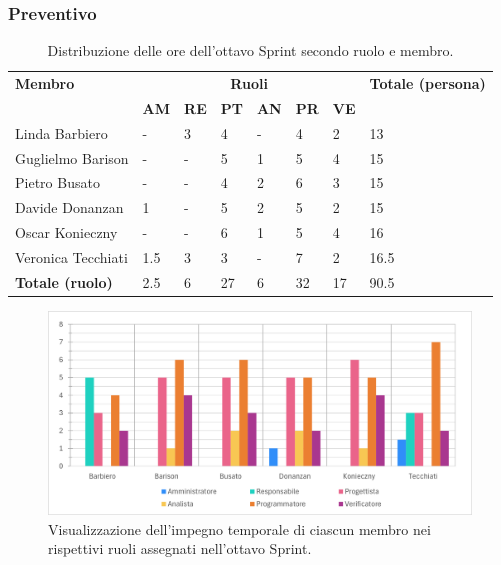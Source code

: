 \documentclass[8pt]{article}
\begin{document}
\subsubsection{Preventivo}\begin{table}[ht!]
	\centering
	\begin{tabular}{p{4cm} p{1cm} p{1cm} p{1cm} p{1cm} p{1cm} p{1cm} p{3cm}}
		\toprule
        \textbf{Membro} & \multicolumn{6}{c}{\textbf{Ruoli}} & \textbf{Totale (persona)}\\
		& \textbf{AM} & \textbf{RE} & \textbf{PT} & \textbf{AN} & \textbf{PR} & \textbf{VE}\\
		\midrule
        Linda Barbiero          & -     & 3     & 4     & -     & 4     & 2     & 13 \\
        Guglielmo Barison       & -     & -     & 5     & 1     & 5     & 4 & 15 \\
        Pietro Busato           & -     & -     & 4     & 2     & 6     & 3     & 15 \\
        Davide Donanzan         & 1     & -     & 5     & 2     & 5     & 2     & 15 \\
        Oscar Konieczny         & -     & -     & 6     & 1     & 5     & 4     & 16 \\
        Veronica Tecchiati      & 1.5     & 3     & 3     & -     & 7     & 2     & 16.5 \\
        \bottomrule
        \textbf{Totale (ruolo)} & 2.5     & 6     & 27    & 6    & 32    & 17    & 90.5 \\
	\end{tabular}
	\caption{Distribuzione delle ore dell'ottavo Sprint secondo ruolo e membro.}
	\label{table:Distribuzione delle ore dell'ottavo Sprint secondo ruolo e membro}
\end{table}
\begin{figure}[ht!]
    \centering
    \includegraphics[width=15cm]{./images_pdp/istogramma_periodo_8.png}
    \caption{Visualizzazione dell'impegno temporale di ciascun membro nei rispettivi ruoli assegnati
    nell'ottavo Sprint.}
    \label{figure:Visualizzazione dell'impegno temporale di ciascun membro nei rispettivi ruoli
    assegnati nell'ottavo Sprint}
\end{figure}
\end{document}
